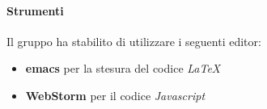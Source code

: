                 \paragraph*{Strumenti}
                Il gruppo ha stabilito di utilizzare i seguenti editor:
                \begin{itemize}
                  \item \textbf{emacs} per la stesura del codice \textit{LaTeX}    %
                  \item \textbf{WebStorm} per il codice \textit{Javascript}       %
                \end{itemize}
